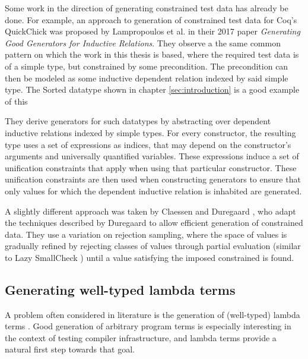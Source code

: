 \documentclass[a4paper,msc,twosized=semi]{uustthesis}
\newcommand{\agda}[1]{{\agdafontinline\color{agdacolor}#1}}
\begin{document}
  Some work in the direction of generating constrained test data has already be done. 
  For example, an approach to generation of constrained test data for Coq's QuickChick 
  was proposed by Lampropoulos et al. \cite{lampropoulos2017generating} in their 2017 
  paper \textit{Generating Good Generators for Inductive Relations}. They observe a 
  the same common pattern on which the work in this thesis is based, where the required 
  test data is of a simple type, but constrained by some precondition. The precondition 
  can then be modeled as some inductive dependent relation indexed by said simple type. 
  The \agda{Sorted} datatype shown in chapter \ref{sec:introduction} is a good example of 
  this

  They derive generators for such datatypes by abstracting over dependent inductive 
  relations indexed by simple types. For every constructor, the resulting type uses a 
  set of expressions as indices, that may depend on the constructor's arguments and 
  universally quantified variables. These expressions induce a set of unification 
  constraints that apply when using that particular constructor. These unification 
  constraints are then used when constructing generators to ensure that only values 
  for which the dependent inductive relation is inhabited are generated. 

  A slightly different approach was taken by Claessen and Duregaard 
  \cite{claessen2015generating}, who adapt the techniques described 
  by Duregaard \cite{duregaard2013feat} to allow efficient generation of constrained 
   data. They use a variation on rejection sampling, where the space of values is 
  gradually refined by rejecting classes of values through partial evaluation 
  (similar to Lazy SmallCheck \cite{runciman2008smallcheck}) until a value satisfying 
  the imposed constrained is found. 

\subsection{Generating well-typed lambda terms}

  A problem often considered in literature is the generation of (well-typed) lambda 
  terms \cite{palka2011testing, grygiel2013counting, claessen2015generating}. Good 
  generation of arbitrary program terms is especially interesting in the context of 
  testing compiler infrastructure, and lambda terms provide a natural first step 
  towards that goal. 
\end{document}

